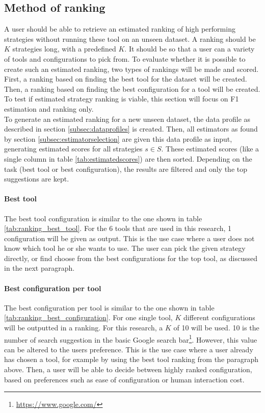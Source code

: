 \subsection{Method of ranking}
A user should be able to retrieve an estimated ranking of high performing strategies without running these tool on an unseen dataset. A ranking should be $K$ strategies long, with a predefined $K$. It should be so that a user can a variety of tools and configurations to pick from. To evaluate whether it is possible to create such an estimated ranking, two types of rankings will be made and scored. First, a ranking based on finding the best tool for the dataset will be created. Then, a ranking based on finding the best configuration for a tool will be created.
To test if estimated strategy ranking is viable, this section will focus on F1 estimation and ranking only. 
\\To generate an estimated ranking for a new unseen dataset, the data profile as described in section \ref{subsec:dataprofiles} is created. Then, all estimators as found by section \ref{subsec:estimatorselection} are given this data profile as input, generating estimated scores for all strategies $s \in S$. These estimated scores (like a single column in table \ref{tab:estimatedscores}) are then sorted. Depending on the task (best tool or best configuration), the results are filtered and only the top suggestions are kept.

\paragraph{Best tool} The best tool configuration is similar to the one shown in table \ref{tab:ranking_best_tool}. For the 6 tools that are used in this research, 1 configuration will be given as output. This is the use case where a user does not know which tool he or she wants to use. The user can pick the given strategy directly, or find choose from the best configurations for the top tool, as discussed in the next paragraph. 

\paragraph{Best configuration per tool} The best configuration per tool is similar to the one shown in table \ref{tab:ranking_best_configuration}. For one single tool, $K$ different configurations will be outputted in a ranking. For this research, a $K$ of 10 will be used. 10 is the number of search suggestion in the basic Google search bar\footnote{\url{https://www.google.com/}}. However, this value can be altered to the users preference. This is the use case where a user already has chosen a tool, for example by using the best tool ranking from the paragraph above. Then, a user will be able to decide between highly ranked configuration, based on preferences such as ease of configuration or human interaction cost. 


